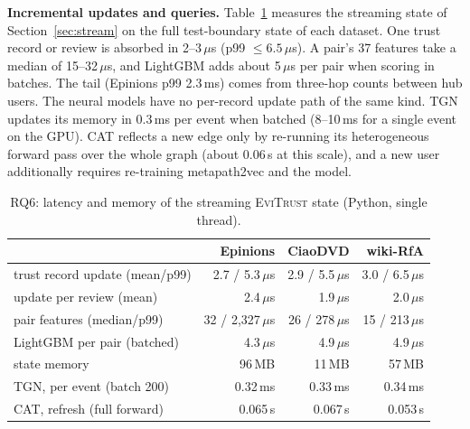 \documentclass[conference]{IEEEtran}
\newcommand{\evi}{\textsc{EviTrust}}
\begin{document}
\textbf{Incremental updates and queries.} Table~\ref{tab:latency} measures the streaming state of Section~\ref{sec:stream} on the full test-boundary state of each dataset. One trust record or review is absorbed in 2--3\,$\mu$s (p99 $\le 6.5\,\mu$s). A pair's 37 features take a median of 15--32\,$\mu$s, and LightGBM adds about 5\,$\mu$s per pair when scoring in batches. The tail (Epinions p99 2.3\,ms) comes from three-hop counts between hub users. The neural models have no per-record update path of the same kind. TGN updates its memory in 0.3\,ms per event when batched (8--10\,ms for a single event on the GPU). CAT reflects a new edge only by re-running its heterogeneous forward pass over the whole graph (about 0.06\,s at this scale), and a new user additionally requires re-training metapath2vec and the model.

\begin{table}[t]
\centering
\caption{RQ6: latency and memory of the streaming \evi{} state (Python, single thread).}
\label{tab:latency}
\setlength{\tabcolsep}{3pt}
\begin{tabular}{lrrr}
\toprule
& Epinions & CiaoDVD & wiki-RfA \\
\midrule
trust record update (mean/p99) & 2.7 / 5.3\,$\mu$s & 2.9 / 5.5\,$\mu$s & 3.0 / 6.5\,$\mu$s \\
update per review (mean) & 2.4\,$\mu$s & 1.9\,$\mu$s & 2.0\,$\mu$s \\
pair features (median/p99) & 32 / 2{,}327\,$\mu$s & 26 / 278\,$\mu$s & 15 / 213\,$\mu$s \\
LightGBM per pair (batched) & 4.3\,$\mu$s & 4.9\,$\mu$s & 4.9\,$\mu$s \\
state memory & 96\,MB & 11\,MB & 57\,MB \\
\midrule
TGN, per event (batch 200) & 0.32\,ms & 0.33\,ms & 0.34\,ms \\
CAT, refresh (full forward) & 0.065\,s & 0.067\,s & 0.053\,s \\
\bottomrule
\end{tabular}
\end{table}
\end{document}
